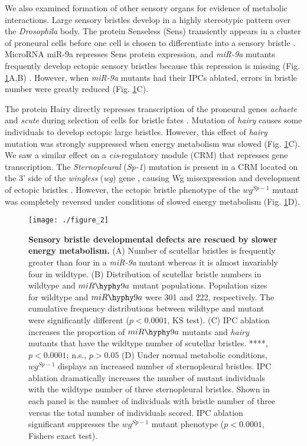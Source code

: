 We also examined formation of other sensory organs for evidence of metabolic interactions. Large sensory bristles develop in a highly stereotypic pattern over the \textit{Drosophila} body. The protein Senseless (Sens) transiently appears in a cluster of proneural cells before one cell is chosen to differentiate into a sensory bristle \cite{JafarNejad2003}. MicroRNA miR-9a represses Sens protein expression, and \textit{miR-9a} mutants frequently develop ectopic sensory bristles because this repression is missing (Fig. \ref{fig:metabolism:fig2}A,B) \cite{Cassidy2013,Li2006}. However, when \textit{miR-9a} mutants had their IPCs ablated, errors in bristle number were greatly reduced (Fig. \ref{fig:metabolism:fig2}C).

The protein Hairy directly represses transcription of the proneural genes \textit{achaete} and \textit{scute} during selection of cells for bristle fates \cite{VanDoren1994}. Mutation of \textit{hairy} causes some individuals to develop ectopic large bristles. However, this effect of \textit{hairy} mutation was strongly suppressed when energy metabolism was slowed (Fig. \ref{fig:metabolism:fig2}C). We saw a similar effect on a \textit{cis}-regulatory module (CRM) that represses gene transcription. The \textit{Sternopleural} (\textit{Sp-1}) mutation is present in a CRM located on the 3' side of the \textit{wingless} (\textit{wg}) gene \cite{Neumann1996a}, causing Wg misexpression and development of ectopic bristles \cite{Neumann1996a}. However, the ectopic bristle phenotype of the $wg^{Sp-1}$ mutant was completely reversed under conditions of slowed energy metabolism (Fig. \ref{fig:metabolism:fig2}D).

\begin{figure}[h!]
\centering
\texttt{[image: ./figure\_2]}
\caption[Reducing energy metabolism rescues sensory bristle patterning.]{\textbf{Sensory bristle developmental defects are rescued by slower energy metabolism.} (A) Number of scutellar bristles is frequently greater than four in a \textit{miR-9a} mutant whereas it is almost invariably four in wildtype. (B) Distribution of scutellar bristle numbers in wildtype and $miR\hyphy  9a$ mutant populations. Population sizes for wildtype and $miR\hyphy  9a$ were 301 and 222, respectively. The cumulative frequency distributions between wildtype and mutant were significantly different ($p<0.0001$, KS test). (C) IPC ablation increases the proportion of $miR\hyphy  9a$ mutants and \textit{hairy} mutants that have the wildtype number of scutellar bristles. ****, $p<0.0001$; n.s., $p>0.05$ (D) Under normal metabolic conditions, $wg^{Sp-1}$ displays an increased number of sternopleural bristles. IPC ablation dramatically increases the number of mutant individuals with the wildtype number of three sternopleural bristles. Shown in each panel is the number of individuals with bristle number of three versus the total number of individuals scored. IPC ablation significant suppresses the $wg^{Sp-1}$ mutant phenotype ($p<0.0001$, Fishers exact test).}
\label{fig:metabolism:fig2}
\end{figure}

